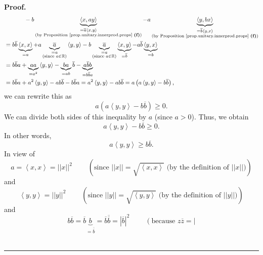 \documentclass[numbers=enddot,12pt,final,onecolumn,notitlepage]{scrartcl}%
\numberwithin{exer}{subsection}
\theoremstyle{definition}
\newenvironment{proof}[1][Proof]{\noindent\textbf{#1.} }{\ \rule{0.5em}{0.5em}}
\begin{document}
\begin{proof}
\begin{align*}
&  \ \ \ \ \ \ \ \ \ \ -b\underbrace{\left\langle x,ay\right\rangle
}_{\substack{=\overline{a}\left\langle x,y\right\rangle \\\text{(by
Proposition \ref{prop.unitary.innerprod.props} \textbf{(f)})}}%
}-a\underbrace{\left\langle y,bx\right\rangle }_{\substack{=\overline
{b}\left\langle y,x\right\rangle \\\text{(by Proposition
\ref{prop.unitary.innerprod.props} \textbf{(f)})}}}\\
&  =b\overline{b}\underbrace{\left\langle x,x\right\rangle }_{=a}%
+a\underbrace{\overline{a}}_{\substack{=a\\\text{(since }a\in\mathbb{R}%
\text{)}}}\left\langle y,y\right\rangle -b\underbrace{\overline{a}%
}_{\substack{=a\\\text{(since }a\in\mathbb{R}\text{)}}%
}\underbrace{\left\langle x,y\right\rangle }_{=\overline{b}}-a\overline
{b}\underbrace{\left\langle y,x\right\rangle }_{=b}\\
&  =b\overline{b}a+\underbrace{aa}_{=a^{2}}\left\langle y,y\right\rangle
-\underbrace{ba}_{=ab}\overline{b}-\underbrace{a\overline{b}b}_{=b\overline
{b}a}\\
&  =b\overline{b}a+a^{2}\left\langle y,y\right\rangle -ab\overline
{b}-b\overline{b}a=a^{2}\left\langle y,y\right\rangle -ab\overline{b}=a\left(
a\left\langle y,y\right\rangle -b\overline{b}\right)  ,
\end{align*}
we can rewrite this as
\[
a\left(  a\left\langle y,y\right\rangle -b\overline{b}\right)  \geq0.
\]
We can divide both sides of this inequality by $a$ (since $a>0$). Thus, we
obtain
\[
a\left\langle y,y\right\rangle -b\overline{b}\geq0.
\]
In other words,%
\[
a\left\langle y,y\right\rangle \geq b\overline{b}.
\]
In view of
\[
a=\left\langle x,x\right\rangle =\left\vert \left\vert x\right\vert
\right\vert ^{2}\ \ \ \ \ \ \ \ \ \ \left(  \text{since }\left\vert \left\vert
x\right\vert \right\vert =\sqrt{\left\langle x,x\right\rangle }\text{ (by the
definition of }\left\vert \left\vert x\right\vert \right\vert \text{)}\right)
\]
and%
\[
\left\langle y,y\right\rangle =\left\vert \left\vert y\right\vert \right\vert
^{2}\ \ \ \ \ \ \ \ \ \ \left(  \text{since }\left\vert \left\vert
y\right\vert \right\vert =\sqrt{\left\langle y,y\right\rangle }\text{ (by the
definition of }\left\vert \left\vert y\right\vert \right\vert \text{)}\right)
\]
and%
\[
b\overline{b}=\overline{b}\underbrace{b}_{=\overline{\overline{b}}}%
=\overline{b}\overline{\overline{b}}=\left\vert \overline{b}\right\vert
^{2}\ \ \ \ \ \ \ \ \ \ \left(  \text{because }z\overline{z}=\left\vert
\]
\end{proof}
\end{document}
